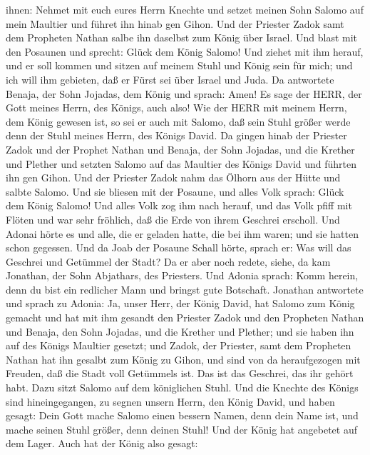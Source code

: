 ihnen: Nehmet mit euch eures Herrn Knechte und setzet meinen Sohn Salomo
auf mein Maultier und führet ihn hinab gen Gihon.  Und der
Priester Zadok samt dem Propheten Nathan salbe ihn daselbst zum König
über Israel. Und blast mit den Posaunen und sprecht: Glück dem König
Salomo!  Und ziehet mit ihm herauf, und er soll kommen und
sitzen auf meinem Stuhl und König sein für mich; und ich will ihm
gebieten, daß er Fürst sei über Israel und Juda.  Da
antwortete Benaja, der Sohn Jojadas, dem König und sprach: Amen! Es sage
der HERR, der Gott meines Herrn, des Königs, auch also! 
Wie der HERR mit meinem Herrn, dem König gewesen ist, so sei er auch mit
Salomo, daß sein Stuhl größer werde denn der Stuhl meines Herrn, des
Königs David.  Da gingen hinab der Priester Zadok und der
Prophet Nathan und Benaja, der Sohn Jojadas, und die Krether und Plether
und setzten Salomo auf das Maultier des Königs David und führten ihn gen
Gihon.  Und der Priester Zadok nahm das Ölhorn aus der
Hütte und salbte Salomo. Und sie bliesen mit der Posaune, und alles Volk
sprach: Glück dem König Salomo!  Und alles Volk zog ihm
nach herauf, und das Volk pfiff mit Flöten und war sehr fröhlich, daß
die Erde von ihrem Geschrei erscholl.  Und Adonai hörte es
und alle, die er geladen hatte, die bei ihm waren; und sie hatten schon
gegessen. Und da Joab der Posaune Schall hörte, sprach er: Was will das
Geschrei und Getümmel der Stadt?  Da er aber noch redete,
siehe, da kam Jonathan, der Sohn Abjathars, des Priesters. Und Adonia
sprach: Komm herein, denn du bist ein redlicher Mann und bringst gute
Botschaft.  Jonathan antwortete und sprach zu Adonia: Ja,
unser Herr, der König David, hat Salomo zum König gemacht 
und hat mit ihm gesandt den Priester Zadok und den Propheten Nathan und
Benaja, den Sohn Jojadas, und die Krether und Plether; und sie haben ihn
auf des Königs Maultier gesetzt;  und Zadok, der Priester,
samt dem Propheten Nathan hat ihn gesalbt zum König zu Gihon, und sind
von da heraufgezogen mit Freuden, daß die Stadt voll Getümmels ist. Das
ist das Geschrei, das ihr gehört habt.  Dazu sitzt Salomo
auf dem königlichen Stuhl.  Und die Knechte des Königs sind
hineingegangen, zu segnen unsern Herrn, den König David, und haben
gesagt: Dein Gott mache Salomo einen bessern Namen, denn dein Name ist,
und mache seinen Stuhl größer, denn deinen Stuhl! Und der König hat
angebetet auf dem Lager.  Auch hat der König also gesagt:
